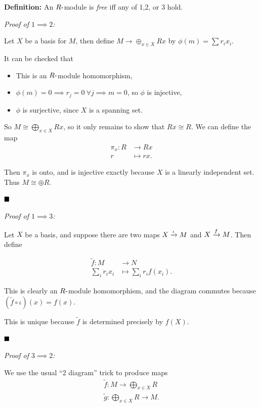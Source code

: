 \textbf{Definition:} An \(R{\hbox{-}}\)module is \emph{free} iff any of 1,2,
or 3 hold.

\emph{Proof of \(1 \implies 2\):}

Let \(X\) be a basis for \(M\), then define \(M \to \oplus_{x\in X} Rx\)
by \(\phi(m) = \sum r_i x_i\).

It can be checked that

\begin{itemize}
\item
  This is an \(R{\hbox{-}}\)module homomorphism,
\item
  \(\phi(m) = 0 \implies r_j = 0 ~\forall j \implies m = 0\), so
  \(\phi\) is injective,
\item
  \(\phi\) is surjective, since \(X\) is a spanning set.
\end{itemize}

So \(M \cong \bigoplus_{x\in X} Rx\), so it only remains to show that
\(Rx \cong R\). We can define the map \begin{align*}
\pi_x: R &\to Rx \\
r &\mapsto rx
.\end{align*}

Then \(\pi_x\) is onto, and is injective exactly because \(X\) is a
linearly independent set. Thus \(M \cong \oplus R\).

\(\qed\)

\emph{Proof of \(1 \implies 3\):}

Let \(X\) be a basis, and suppose there are two maps
\(X \xrightarrow{\iota} M\) and \(X \xrightarrow{f} M\). Then define

\begin{align*}
\tilde f: M &\to N \\
\sum_i r_i x_i &\mapsto \sum_i r_i f(x_i)
.\end{align*}

This is clearly an \(R{\hbox{-}}\)module homomorphism, and the diagram
commutes because \((\tilde f \circ \iota)(x) = f(x)\).

This is unique because \(\tilde f\) is determined precisely by \(f(X)\).

\(\qed\)

\emph{Proof of \(3 \implies 2\):}

We use the usual ``2 diagram'' trick to produce maps \begin{align*}
\tilde f: M \to \bigoplus_{x\in X} R \\
\tilde g: \bigoplus_{x\in X}R \to M
.\end{align*}

